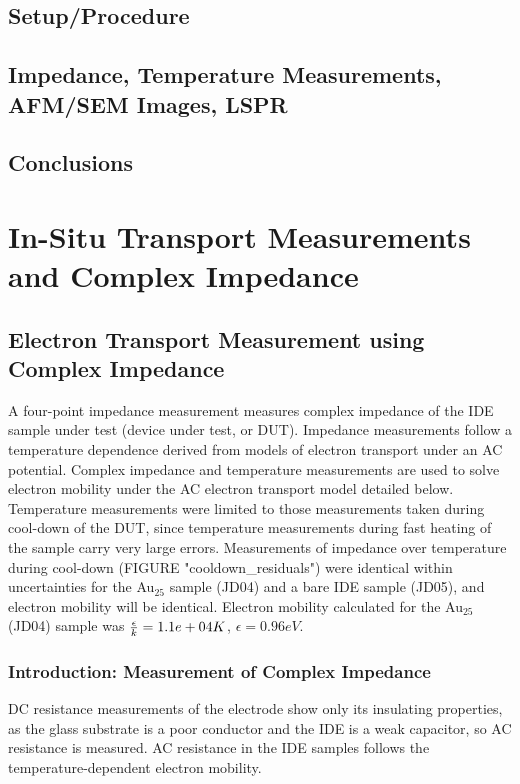 \documentclass[12pt,oneside,english]{article}
\begin{document}
	\subsection{Setup/Procedure}
	\subsection{Impedance, Temperature Measurements, AFM/SEM Images, LSPR}
	\subsection{Conclusions}


	\section{In-Situ Transport Measurements and Complex Impedance}

	\subsection{Electron Transport Measurement using Complex Impedance}
	A four-point impedance measurement measures complex impedance of the IDE sample under test (device under test, or DUT).  
	Impedance measurements follow a temperature dependence derived from models of electron transport under an AC potential.  
	Complex impedance and temperature measurements are used to solve electron mobility under the AC electron transport model detailed below.  
	Temperature measurements were limited to those measurements taken during cool-down of the DUT, since temperature measurements during fast heating of the sample carry very large errors.  
	Measurements of impedance over temperature during cool-down (FIGURE "cooldown\_residuals") were identical within uncertainties for the Au$_25$ sample (JD04) and a bare IDE sample (JD05), and electron mobility will be identical.  
	Electron mobility calculated for the Au$_25$ (JD04) sample was ${\epsilon\over{k}} = 1.1e+04 K$, $\epsilon = 0.96 eV$.
		
	\subsubsection{Introduction: Measurement of Complex Impedance} 
	DC resistance measurements of the electrode show only its insulating properties, as the glass substrate is a poor conductor and the IDE is a weak capacitor, so AC resistance is measured.
	AC resistance in the IDE samples follows the temperature-dependent electron mobility.
	
\end{document}
